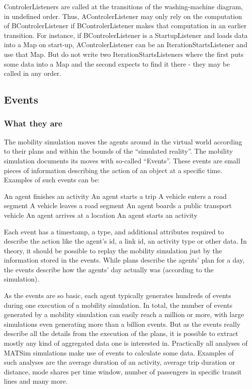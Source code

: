 ControlerListeners are called at the transitions of the washing-machine diagram, in undefined order.
Thus, AControlerListener may only rely on the computation of BControlerListener if BControlerListener
 makes that computation in an earlier transition. For instance, if BControlerListener is a StartupListener
 and loads data into a Map on start-up, AControlerListener can be an IterationStartsListener and use that Map.
 But do not write two IterationStartsListeners where the first puts some data into a Map and the second expects
 to find it there - they may be called in any order.

\subsection{Events}
\label{sec:events}
\subsubsection{What they are}
The mobility simulation moves the agents around in the virtual world according to their plans and within the bounds of the ``simulated reality''. The mobility simulation documents its moves with so-called ``Events''. These events are small pieces of information describing the action of an object at a specific time. Examples of such events can be:

    An agent finishes an activity
    An agent starts a trip
    A vehicle enters a road segment
    A vehicle leaves a road segment
    An agent boards a public transport vehicle
    An agent arrives at a location
    An agent starts an activity

Each event has a timestamp, a type, and additional attributes required to describe the action like the agent's id, a link id, an activity type or other data. In theory, it should be possible to replay the mobility simulation just by the information stored in the events. While plans describe the agents' plan for a day, the events describe how the agents' day actually was (according to the simulation).

As the events are so basic, each agent typically generates hundreds of events during one execution of a mobility simulation. In total, the number of events generated by a mobility simulation can easily reach a million or more, with large simulations even generating more than a billion events. But as the events really describe all the details from the execution of the plans, it is possible to extract mostly any kind of aggregated data one is interested in. Practically all analyses of MATSim simulations make use of events to calculate some data. Examples of such analyses are the average duration of an activity, average trip duration or distance, mode shares per time window, number of passengers in specific transit lines and many more.

